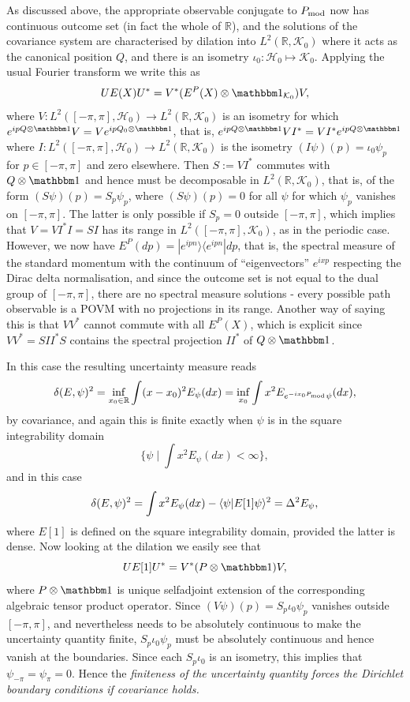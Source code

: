 As discussed above, the appropriate observable conjugate to $P_{\mathrm{mod}}$ now has continuous outcome set (in fact the whole of $\mathbb R$), and the solutions of the covariance system are characterised by dilation into $L^2(\mathbb R, \mathcal K_0)$ where it acts as the canonical position $Q$, and there is an isometry $\iota_0:\mathcal H_0\mapsto \mathcal K_0$. Applying the usual Fourier transform we write this as 
\begin{align}
UE(X)U^* = V^* (E^P(X)\otimes \id_{\mathcal K_0})V,
\end{align}
where $V:L^2([-\pi,\pi], \mathcal H_0)\to L^2(\mathbb R, \mathcal K_0)$ is an isometry for which $e^{ip Q\otimes \id}V=Ve^{ipQ_0\otimes \id}$, that is, $e^{ip Q\otimes \id}VI^* =VI^*e^{ipQ\otimes \id}$ where $I:L^2([-\pi,\pi], \mathcal H_0)\to L^2(\mathbb R, \mathcal K_0)$ is the isometry $(I\psi)(p) = \iota_0\psi_p$ for $p\in [-\pi,\pi]$ and zero elsewhere. Then $S:=VI^*$ commutes with $Q\otimes \id$ and hence must be decomposable in $L^2(\mathbb R,\mathcal K_0)$, that is, of the form $(S\psi)(p) = S_p\psi_p$, where $(S\psi)(p)=0$ for all $\psi$ for which $\psi_p$ vanishes on $[-\pi,\pi]$. The latter is only possible if $S_p=0$ outside $[-\pi,\pi]$, which implies that $V = VI^*I = SI$ has its range in $L^2([-\pi,\pi], \mathcal K_0)$, as in the periodic case. However, we now have $E^P(dp)=|e^{ipn}\rangle\langle e^{ipn}| dp$, that is, the spectral measure of the standard momentum with the continuum of ``eigenvectors'' $e^{ixp}$ respecting the Dirac delta normalisation, and since the outcome set is not equal to the dual group of $[-\pi,\pi]$, there are no spectral measure solutions - every possible path observable is a POVM with no projections in its range. Another way of saying this is that $VV^*$ cannot commute with all $E^P(X)$, which is explicit since $VV^*=SII^*S$ contains the spectral projection $II^*$ of $Q\otimes \id$.

In this case the resulting uncertainty measure reads
$$
\delta(E,\psi)^2 = \inf_{x_0\in \mathbb R} \int (x-x_0)^2 E_\psi(dx) = \inf_{x_0}\int x^2 E_{e^{-ix_0P_{\mathrm{mod}}}\psi}(dx),
$$
by covariance, and again this is finite exactly when $\psi$ is in the square integrability domain
$$
\{ \psi\mid \int x^2 E_{\psi}(dx) <\infty\},
$$
and in this case
$$
\delta(E,\psi)^2 = \int x^2 E_\psi(dx) - \langle \psi| E[1]\psi\rangle^2 = \var{E_\psi},
$$
where $E[1]$ is defined on the square integrability domain, provided the latter is dense. Now looking at the dilation we easily see that
$$
UE[1]U^* = V^*(P\otimes \id)V,
$$
where $P\otimes \id$ is unique selfadjoint extension of the corresponding algebraic tensor product operator. Since $(V\psi)(p)= S_p\iota_0\psi_p$ vanishes outside $[-\pi,\pi]$, and nevertheless needs to be absolutely continuous to make the uncertainty quantity finite,  $S_p\iota_0\psi_p$ must be absolutely continuous and hence vanish at the boundaries. Since each $S_p\iota_0$ is an isometry, this implies that $\psi_{-\pi}=\psi_{\pi}=0$. Hence the \emph{finiteness of the uncertainty quantity forces the Dirichlet boundary conditions if covariance holds.}

